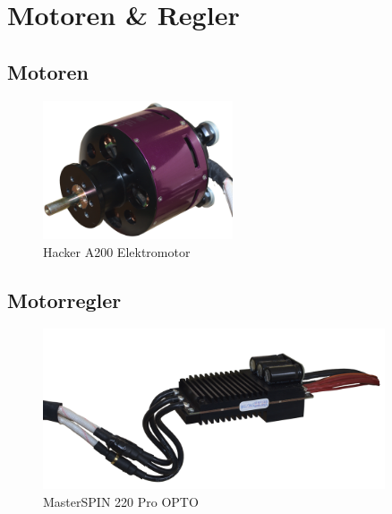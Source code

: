\section{Motoren \& Regler}
\subsection{Motoren}
\begin{figure}[h]
    \centering
    \includegraphics[width=0.5\textwidth]{Fotos/Motor.png}
    \caption{Hacker A200 Elektromotor}
\end{figure}
\newpage
\subsection{Motorregler}
\begin{figure}[h]
    \centering
    \includegraphics[width=0.9\textwidth]{Fotos/MasterSpin_ohne_Halter.png}
    \caption{MasterSPIN 220 Pro OPTO}
\end{figure}
